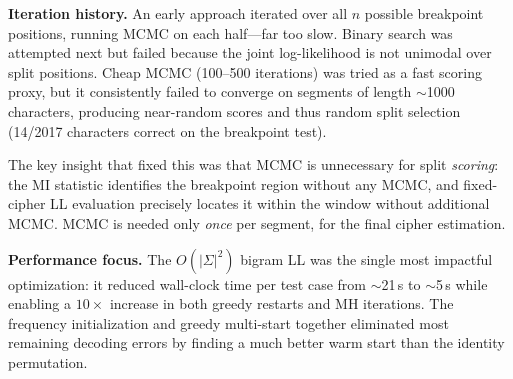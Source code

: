 \documentclass[12pt]{article}
\begin{document}
\textbf{Iteration history.} An early approach iterated over all $n$ possible
breakpoint positions, running MCMC on each half---far too slow.  Binary search
was attempted next but failed because the joint log-likelihood is not
unimodal over split positions.  Cheap MCMC (100--500 iterations) was tried as
a fast scoring proxy, but it consistently failed to converge on segments of
length $\sim$1000 characters, producing near-random scores and thus random
split selection (14/2017 characters correct on the breakpoint test).

The key insight that fixed this was that MCMC is unnecessary for split
\emph{scoring}: the MI statistic identifies the breakpoint region without any
MCMC, and fixed-cipher LL evaluation precisely locates it within the window
without additional MCMC.  MCMC is needed only \emph{once} per segment, for
the final cipher estimation.

\textbf{Performance focus.} The $O(|\Sigma|^2)$ bigram LL was the single most
impactful optimization: it reduced wall-clock time per test case from
$\sim$21\,s to $\sim$5\,s while enabling a $10\times$ increase in both greedy
restarts and MH iterations.  The frequency initialization and greedy
multi-start together eliminated most remaining decoding errors by finding a
much better warm start than the identity permutation.
\end{document}
